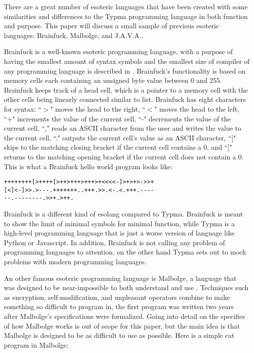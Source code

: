 \documentclass[10pt,twocolumn]{article}
\begin{document}
There are a great number of esoteric languages that have been created with some similarities and differences to the Typma programming language in both function and purpose. This paper will discuss a small sample of previous esoteric languages: Brainfuck, Malbolge, and J.A.V.A..

Brainfuck is a well-known esoteric programming language, with a purpose of having the smallest amount of syntax symbols and the smallest size of compiler of any programming language is described in \textcite{Morr2014Esoteric}. Brainfuck's functionality is based on memory cells each containing an unsigned byte value between 0 and 255. Brainfuck keeps track of a head cell, which is a pointer to a memory cell with the other cells being linearly connected similar to list. Brainfuck has eight characters for syntax: ``$>$" moves the head to the right, ``$<$" moves the head to the left, ``+" increments the value of the current cell, ``-" decrements the value of the current cell, ``," reads an ASCII character from the user and writes the value to the current cell, ``." outputs the current cell’s value as an ASCII character, ``[" skips to the matching closing bracket if the current cell contains a 0, and ``]" returns to the matching opening bracket if the current cell does not contain a 0. This is what a Brainfuck hello world program looks like:

\begin{lstlisting}
++++++++[>++++[>++>+++>+++>+<<<<-]>+>+>->>+
[<]<-]>>.>---.+++++++..+++.>>.<-.<.+++.----
--.--------.>>+.>++.
\end{lstlisting}

Brainfuck is a different kind of esolang compared to Typma. Brainfuck is meant to show the limit of minimal symbols for minimal function, while Typma is a high-level programming language that is just a worse version of language like Python or Javascript. In addition, Brainfuck is not calling any problem of programming languages to attention, on the other hand Typma sets out to mock problems with modern programming languages.

An other famous esoteric programming language is Malbolge, a language that was designed to be near-impossible to both understand and use \textcite{Morr2014Esoteric}. Techniques such as encryption, self-modification, and unpleasant operators combine to make something so difficult to program in, the first program was written two years after Malbolge's specifications were formalized. Going into detail on the specifics of how Malbolge works is out of scope for this paper, but the main idea is that Malbolge is designed to be as difficult to use as possible. Here is a simple cat program in Malbolge:
\end{document}
